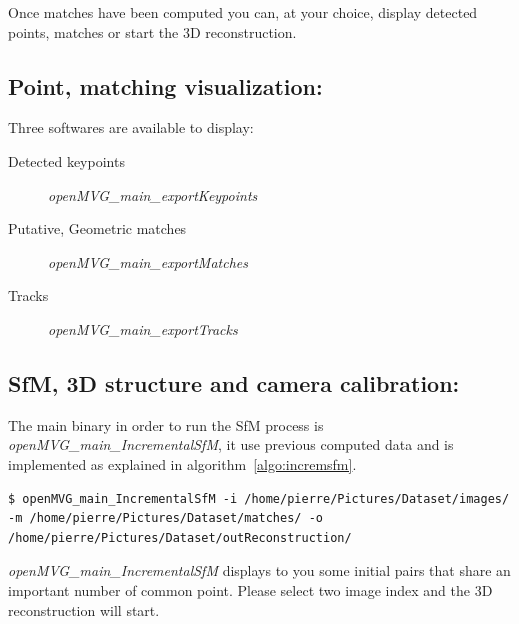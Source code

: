 \documentclass[11pt, letterpaper]{report}
\begin{document}
Once matches have been computed you can, at your choice, display detected points, matches or start the 3D reconstruction.

\subsection*{Point, matching visualization:}

Three softwares are available to display:
\begin{description}
\item[Detected keypoints] \textit{openMVG\_main\_exportKeypoints}
\item[Putative, Geometric matches] \textit{openMVG\_main\_exportMatches}
\item[Tracks] \textit{openMVG\_main\_exportTracks}
\end{description}

\subsection*{SfM, 3D structure and camera calibration:}

The main binary in order to run the SfM process is \textit{openMVG\_main\_IncrementalSfM}, it use previous computed data and is implemented as explained in algorithm~\ref{algo:incremsfm}.
\vspace{-.5cm}
\begin{lstlisting}
$ openMVG_main_IncrementalSfM -i /home/pierre/Pictures/Dataset/images/ -m /home/pierre/Pictures/Dataset/matches/ -o /home/pierre/Pictures/Dataset/outReconstruction/
\end{lstlisting}

\textit{openMVG\_main\_IncrementalSfM} displays to you some initial pairs that share an important number of common point. Please select two image index and the 3D reconstruction will start.



\end{document}
